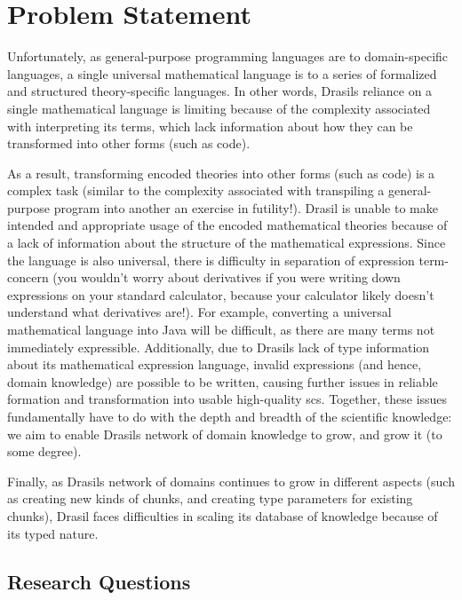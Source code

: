\section{Problem Statement}
\label{sec:intro:problemStatement}


Unfortunately, as general-purpose programming languages are to domain-specific
languages, a single universal mathematical language is to a series of formalized
and structured theory-specific languages. In other words, Drasils reliance on a
single mathematical language is limiting because of the complexity associated
with interpreting its terms, which lack information about how they can be
transformed into other forms (such as code).

As a result, transforming encoded theories into other forms (such as code) is a
complex task (similar to the complexity associated with transpiling a
general-purpose program into another \textemdash{} an exercise in futility!). Drasil is
unable to make intended and appropriate usage of the encoded mathematical
theories because of a lack of information about the structure of the
mathematical expressions. Since the language is also universal, there is
difficulty in separation of expression term-concern (you wouldn't worry about
derivatives if you were writing down expressions on your standard calculator,
because your calculator likely doesn't understand what derivatives are!). For
example, converting a universal mathematical language into Java will be
difficult, as there are many terms not immediately expressible. Additionally,
due to Drasils lack of type information about its mathematical expression
language, invalid expressions (and hence, domain knowledge) are possible to be
written, causing further issues in reliable formation and transformation into
usable high-quality \acs{scs}. Together, these issues fundamentally have to do
with the depth and breadth of the scientific knowledge: we aim to enable Drasils
network of domain knowledge to grow, and grow it (to some degree).

Finally, as Drasils network of domains continues to grow in different aspects
(such as creating new kinds of chunks, and creating type parameters for existing
chunks), Drasil faces difficulties in scaling its database of knowledge because
of its typed nature.

\subsection{Research Questions}
\label{sec:intro:researchquestions}

